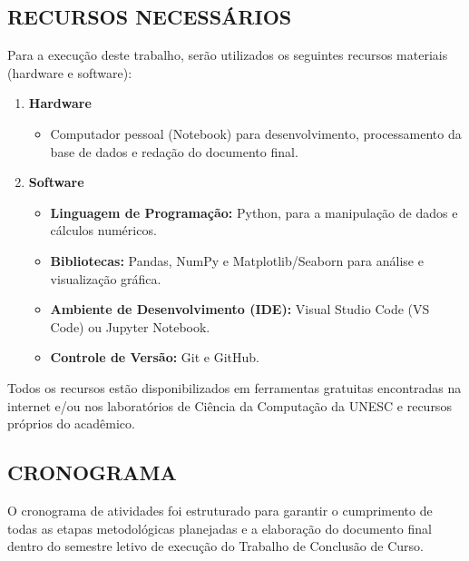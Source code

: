 \documentclass{UNESC}
\begin{document}
\subsection{RECURSOS NECESSÁRIOS}

Para a execução deste trabalho, serão utilizados os seguintes recursos materiais (hardware e software):

\begin{enumerate}
    \item \textbf{Hardware}
    \begin{itemize}
        \item Computador pessoal (Notebook) para desenvolvimento, processamento da base de dados e redação do documento final.
    \end{itemize}
    \item \textbf{Software}
    \begin{itemize}
        \item \textbf{Linguagem de Programação:} Python, para a manipulação de dados e cálculos numéricos.
        \item \textbf{Bibliotecas:} Pandas, NumPy e Matplotlib/Seaborn para análise e visualização gráfica.
        \item \textbf{Ambiente de Desenvolvimento (IDE):} Visual Studio Code (VS Code) ou Jupyter Notebook.
        \item \textbf{Controle de Versão:} Git e GitHub.
    \end{itemize}
\end{enumerate}

Todos os recursos estão disponibilizados em ferramentas gratuitas encontradas na internet e/ou nos laboratórios de Ciência da Computação da UNESC e recursos próprios do acadêmico.

\subsection{CRONOGRAMA}

O cronograma de atividades foi estruturado para garantir o cumprimento de todas as etapas metodológicas planejadas e a elaboração do documento final dentro do semestre letivo de execução do Trabalho de Conclusão de Curso.

\renewcommand{\tablename}{Quadro} %
\setcounter{table}{0} %
\end{document}
